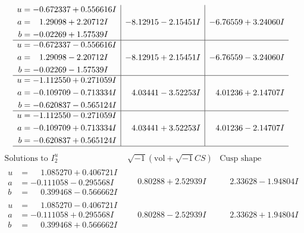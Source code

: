 \documentclass[1p]{elsarticle_modified}
\theoremstyle{definition}
\newcommand{\I}{\sqrt{-1}}
\begin{document}
$$\begin{array}{c|c|c}
\begin{aligned}
u &= -0.672337 + 0.556616 I \\
a &= \phantom{-}1.29098 + 2.20712 I \\
b &= -0.02269 + 1.57539 I\end{aligned}
 & -8.12915 - 2.15451 I & -6.76559 + 3.24060 I \\ \hline\begin{aligned}
u &= -0.672337 - 0.556616 I \\
a &= \phantom{-}1.29098 - 2.20712 I \\
b &= -0.02269 - 1.57539 I\end{aligned}
 & -8.12915 + 2.15451 I & -6.76559 - 3.24060 I \\ \hline\begin{aligned}
u &= -1.112550 + 0.271059 I \\
a &= -0.109709 - 0.713334 I \\
b &= -0.620837 - 0.565124 I\end{aligned}
 & \phantom{-}4.03441 - 3.52253 I & \phantom{-}4.01236 + 2.14707 I \\ \hline\begin{aligned}
u &= -1.112550 - 0.271059 I \\
a &= -0.109709 + 0.713334 I \\
b &= -0.620837 + 0.565124 I\end{aligned}
 & \phantom{-}4.03441 + 3.52253 I & \phantom{-}4.01236 - 2.14707 I\\
 \hline 
 \end{array}$$\newpage$$\begin{array}{c|c|c}  
\text{Solutions to }I^u_{2}& \I (\text{vol} + \sqrt{-1}CS) & \text{Cusp shape}\\
 \hline 
\begin{aligned}
u &= \phantom{-}1.085270 + 0.406721 I \\
a &= -0.111058 - 0.295568 I \\
b &= \phantom{-}0.399468 - 0.566662 I\end{aligned}
 & \phantom{-}0.80288 + 2.52939 I & \phantom{-}2.33628 - 1.94804 I \\ \hline\begin{aligned}
u &= \phantom{-}1.085270 - 0.406721 I \\
a &= -0.111058 + 0.295568 I \\
b &= \phantom{-}0.399468 + 0.566662 I\end{aligned}
 & \phantom{-}0.80288 - 2.52939 I & \phantom{-}2.33628 + 1.94804 I \\ \hline\begin{aligned}

\end{aligned}
\end{array}$$
\end{document}
